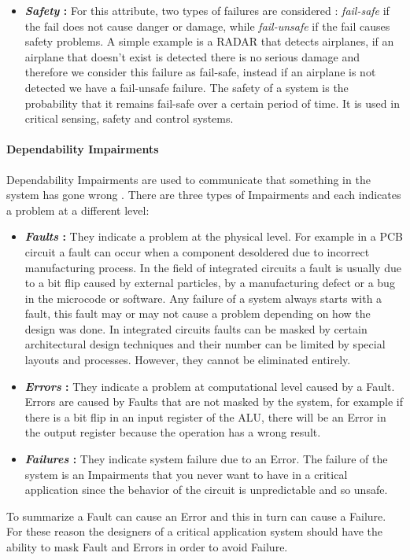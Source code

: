 {{{{\begin{itemize}
					\item \textbf{\textit{Safety} : } For this attribute, two types of failures are considered : \textit{fail-safe} if the fail does not cause danger or damage, while \textit{fail-unsafe} if the fail causes safety problems. A simple example is a RADAR that detects airplanes, if an airplane that doesn't exist is detected there is no serious damage and therefore we consider this failure as fail-safe, instead if an airplane is not detected we have a fail-unsafe failure. The safety of a system is the probability that it remains fail-safe over a certain period of time. It is used in critical sensing, safety and control systems. 
				\end{itemize}	
				
			} %
			\paragraph{Dependability Impairments}{
				Dependability Impairments are used to communicate that something in the system has gone wrong . There are three types of Impairments and each indicates a problem at a different level:
				\begin{itemize}
					\item \textbf{\textit{Faults} : } They indicate a problem at the physical level. For example in a PCB circuit a fault can occur when a component desoldered due to incorrect manufacturing process. In the field of integrated circuits a fault is usually due to a bit flip caused by external particles, by a manufacturing defect or a bug in the microcode or software. Any failure of a system always starts with a fault, this fault may or may not cause a problem depending on how the design was done. In integrated circuits faults can be masked by certain architectural design techniques and their number can be limited by special layouts and processes. However, they cannot be eliminated entirely.

					\item \textbf{\textit{Errors} : } They indicate a problem at computational level caused by a Fault. Errors are caused by Faults that are not masked by the system, for example if there is a  bit flip in an input register of the ALU, there will be an Error in the output register because the operation has a wrong result.
					
					\item \textbf{\textit{Failures} : }  They indicate system failure due to an Error. The failure of the system is an Impairments that you never want to have in a critical application since the behavior of the circuit is unpredictable and so unsafe. 
				\end{itemize}	
				To summarize a Fault can cause an Error and this in turn can cause a Failure. For these reason the designers of a critical application system should have the ability to mask Fault and Errors in order to avoid Failure.
			} %
}}}
